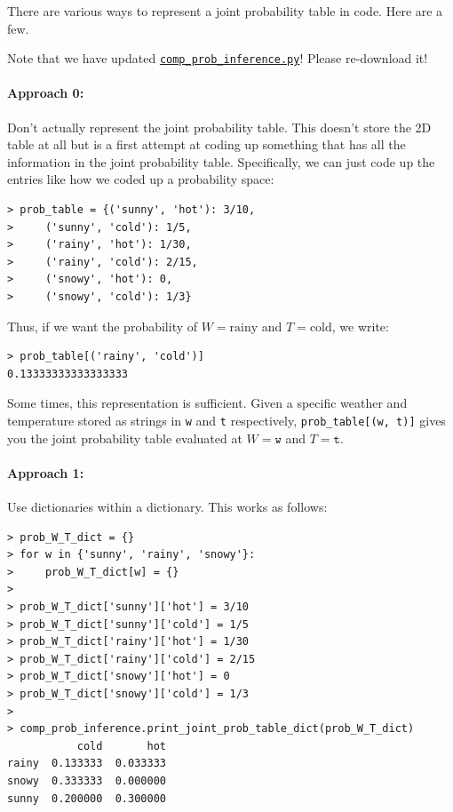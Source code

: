\documentclass[6008notes.tex]{subfiles}
\begin{document}
There are various ways to represent a joint probability table in code. Here are a few.

Note that we have updated \href{https://d37djvu3ytnwxt.cloudfront.net/assets/courseware/v1/710ba23b569da54c14fc614315ced6a1/asset-v1:MITx+6.008.1x+3T2016+type@asset+block/comp_prob_inference.py}{\texttt{comp\_prob\_inference.py}}! Please re-download it!

\paragraph{Approach 0:} Don't actually represent the joint probability table. This doesn't store the 2D table at all but is a first attempt at coding up something that has all the information in the joint probability table. Specifically, we can just code up the entries like how we coded up a probability space:

\begin{lstlisting}
> prob_table = {('sunny', 'hot'): 3/10,
>     ('sunny', 'cold'): 1/5,
>     ('rainy', 'hot'): 1/30,
>     ('rainy', 'cold'): 2/15,
>     ('snowy', 'hot'): 0,
>     ('snowy', 'cold'): 1/3}
\end{lstlisting}

Thus, if we want the probability of $W=\text {rainy}$ and $T=\text {cold}$, we write:

\begin{lstlisting}
> prob_table[('rainy', 'cold')]
0.13333333333333333
\end{lstlisting}

Some times, this representation is sufficient. Given a specific weather and temperature stored as strings in \texttt{w} and \texttt{t} respectively, \lstinline{prob_table[(w, t)]} gives you the joint probability table evaluated at $W = \texttt{w}$ and $T = \texttt{t}$.

\paragraph{Approach 1:} Use dictionaries within a dictionary. This works as follows:

\begin{lstlisting}
> prob_W_T_dict = {}
> for w in {'sunny', 'rainy', 'snowy'}:
>     prob_W_T_dict[w] = {}
>
> prob_W_T_dict['sunny']['hot'] = 3/10
> prob_W_T_dict['sunny']['cold'] = 1/5
> prob_W_T_dict['rainy']['hot'] = 1/30
> prob_W_T_dict['rainy']['cold'] = 2/15
> prob_W_T_dict['snowy']['hot'] = 0
> prob_W_T_dict['snowy']['cold'] = 1/3
>
> comp_prob_inference.print_joint_prob_table_dict(prob_W_T_dict)
           cold       hot
rainy  0.133333  0.033333
snowy  0.333333  0.000000
sunny  0.200000  0.300000
\end{lstlisting}
\end{document}

